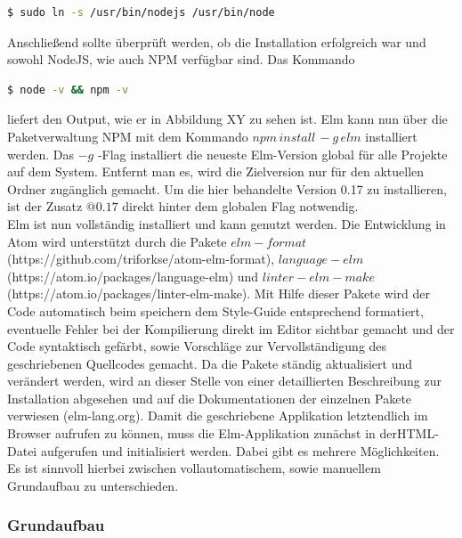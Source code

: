 \begin{lstlisting}[language=bash]
$ sudo ln -s /usr/bin/nodejs /usr/bin/node
\end{lstlisting}
Anschließend sollte überprüft werden, ob die Installation erfolgreich war und sowohl NodeJS, wie auch NPM verfügbar sind. Das Kommando \begin{lstlisting}[language=bash]
$ node -v && npm -v
\end{lstlisting}
liefert den Output, wie er in Abbildung XY zu sehen ist. Elm kann nun über die Paketverwaltung NPM mit dem Kommando 
$npm\,install\,-g\,elm$ installiert werden. Das $-g$ -Flag installiert die neueste Elm-Version global für alle Projekte auf dem System. Entfernt man es, wird die Zielversion nur für den aktuellen Ordner zugänglich gemacht. Um die hier behandelte Version 0.17 zu installieren, ist der Zusatz $@0.17$ direkt hinter dem globalen Flag notwendig.\\
Elm ist nun vollständig installiert und kann genutzt werden. Die Entwicklung in Atom wird unterstützt durch die Pakete $elm-format$\\ (https://github.com/triforkse/atom-elm-format), $language-elm$\\ (https://atom.io/packages/language-elm) und {$linter-elm-make$}\\ (https://atom.io/packages/linter-elm-make). Mit Hilfe dieser Pakete wird der Code automatisch beim speichern dem Style-Guide entsprechend formatiert, eventuelle Fehler bei der Kompilierung direkt im Editor sichtbar gemacht und der Code syntaktisch gefärbt, sowie Vorschläge zur Vervollständigung des geschriebenen Quellcodes gemacht. Da die Pakete ständig aktualisiert und verändert werden, wird an dieser Stelle von einer detaillierten Beschreibung zur Installation abgesehen und auf die Dokumentationen der einzelnen Pakete verwiesen (elm-lang.org).
Damit die geschriebene Applikation letztendlich im Browser aufrufen zu können, muss die Elm-Applikation zunächst in der\ac{HTML}-Datei aufgerufen und initialisiert werden. Dabei gibt es mehrere Möglichkeiten. Es ist sinnvoll hierbei zwischen vollautomatischem, sowie manuellem Grundaufbau zu unterschieden.
\subsubsection{Grundaufbau}
\label{sec:Grundaufbau}

